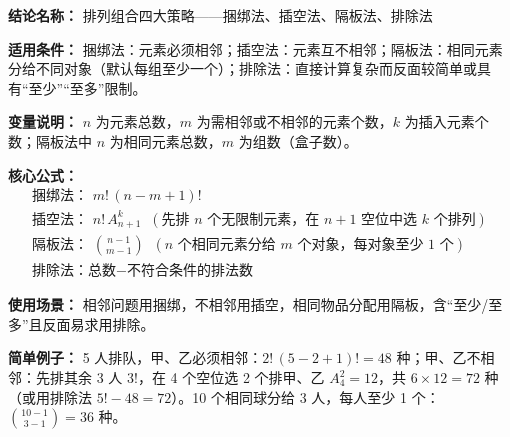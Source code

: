 \textbf{结论名称：} 排列组合四大策略——捆绑法、插空法、隔板法、排除法

\textbf{适用条件：} 
捆绑法：元素必须相邻；插空法：元素互不相邻；隔板法：相同元素分给不同对象（默认每组至少一个）；排除法：直接计算复杂而反面较简单或具有“至少”“至多”限制。

\textbf{变量说明：} 
$n$ 为元素总数，$m$ 为需相邻或不相邻的元素个数，$k$ 为插入元素个数；隔板法中 $n$ 为相同元素总数，$m$ 为组数（盒子数）。

\textbf{核心公式：}
\[
\boxed{
\begin{array}{l}
\text{捆绑法： } m!\,(n-m+1)! \\[4pt]
\text{插空法： } n!\,A_{n+1}^{k} \;\;(\text{先排 }n\text{ 个无限制元素，在 }n+1\text{ 空位中选 }k\text{ 个排列}) \\[4pt]
\text{隔板法： } \displaystyle\binom{n-1}{m-1} \;\;(n\text{ 个相同元素分给 }m\text{ 个对象，每对象至少 }1\text{ 个}) \\[4pt]
\text{排除法：总数}-\text{不符合条件的排法数}
\end{array}
}
\]

\textbf{使用场景：} 
相邻问题用捆绑，不相邻用插空，相同物品分配用隔板，含“至少/至多”且反面易求用排除。

\textbf{简单例子：} 
5 人排队，甲、乙必须相邻：$2!\,(5-2+1)! = 48$ 种；甲、乙不相邻：先排其余 3 人 $3!$，在 4 个空位选 2 个排甲、乙 $A_4^2=12$，共 $6\times12=72$ 种（或用排除法 $5!-48=72$）。10 个相同球分给 3 人，每人至少 1 个：$\binom{10-1}{3-1}=36$ 种。